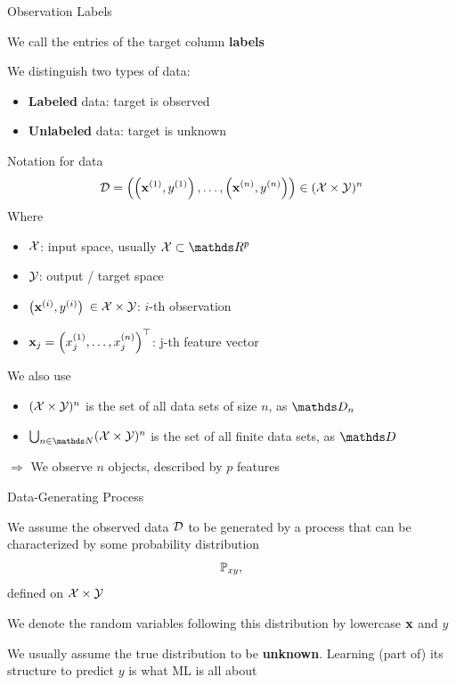 \documentclass[11pt,compress,t,notes=noshow, xcolor=table]{beamer}
\begin{document}
\begin{framei}{Observation Labels}
\item We call the entries of the target column \textbf{labels}
\item We distinguish two types of data:
\begin{itemize}
 \item \textbf{Labeled} data: target is observed
\item \textbf{Unlabeled} data:  target is unknown
\end{itemize}
\vfill
{} %
\end{framei}


\begin{framev}{Notation for data}
$$
\mathcal{D} = \left( \left(\mathbf{x}^{(1)}, y^{(1)}\right), \ldots, \left(\mathbf{x}^{(n)}, y^{(n)}\right)\right) \in (\mathcal{X} \times \mathcal{Y})^n
$$
Where
\begin{itemize}
\item $\mathcal{X}$: input space, usually $\Xspace \subset \R^p$
\item $\mathcal{Y}$: output / target space
\item \(\left(\mathbf{x}^{(i)}, y^{(i)}\right)\) $\in \mathcal{X}\times \mathcal{Y}$:  \(i\)-th observation
\item $\mathbf{x}_j = \left(x^{(1)}_j, \ldots, x^{(n)}_j\right)^\top$: j-th feature vector
\end{itemize}
We also use
\begin{itemize}
\item  $(\mathcal{X} \times \mathcal{Y})^n$ is the set of all data sets of size $n$, as $\allDatasetsn$
\item $\defAllDatasets$ is the set of all finite data sets, as $\allDatasets$
\end{itemize}
\vfill
$\Rightarrow$ We observe $n$ objects, described by $p$ features
\end{framev}


\begin{framei}[sep=L]{Data-Generating Process}
\item We assume the observed data $\mathcal{D}$ to be generated by a process that can be characterized by some probability distribution $$\mathbb{P}_{xy},$$ defined on $\mathcal{X} \times \mathcal{Y}$
\item We denote the random variables following this distribution by lowercase $\mathbf{x}$ and $y$
\item We usually assume the true distribution to be \textbf{unknown}.
Learning (part of) its structure to predict $y$ is what ML is all about
\end{framei}
\end{document}
